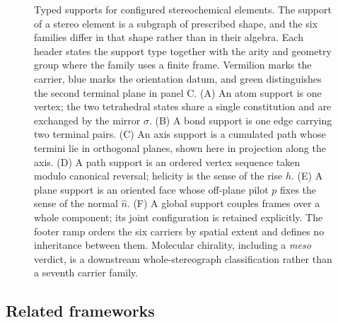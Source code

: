\documentclass[pdflatex,sn-mathphys-num,referee,lineno]{sn-jnl}
\theoremstyle{plain}
\theoremstyle{remark}
\theoremstyle{definition}
\begin{document}
\begin{figure}[htbp]
  \centering
  \resizebox{\textwidth}{!}{}
  \caption{Typed supports for configured stereochemical elements.
  The support of a stereo element is a subgraph of prescribed shape,
  and the six families differ in that shape rather than in their algebra.  Each
  header states the support type together with the arity and geometry group
  where the family uses a finite frame.  Vermilion marks the carrier, blue marks
  the orientation datum, and green distinguishes the second terminal plane in
  panel C.
  (A) An atom support is one vertex; the two tetrahedral states share a single
  constitution and are exchanged by the mirror \(\sigma\).
  (B) A bond support is one edge carrying two terminal pairs.
  (C) An axis support is a cumulated path whose termini lie in orthogonal
  planes, shown here in projection along the axis.
  (D) A path support is an ordered vertex sequence taken modulo canonical
  reversal; helicity is the sense of the rise \(h\).
  (E) A plane support is an oriented face whose off-plane pilot \(p\) fixes the
  sense of the normal \(\hat n\).
  (F) A global support couples frames over a whole component; its joint
  configuration is retained explicitly.
  The footer ramp orders the six carriers by spatial extent and defines no
  inheritance between them.  Molecular chirality, including a \emph{meso}
  verdict, is a downstream whole-stereograph classification rather than a
  seventh carrier family.}
  \label{fig:support-motivation}
\end{figure}

\subsection{Related frameworks}
\label{sec:related}
\end{document}
